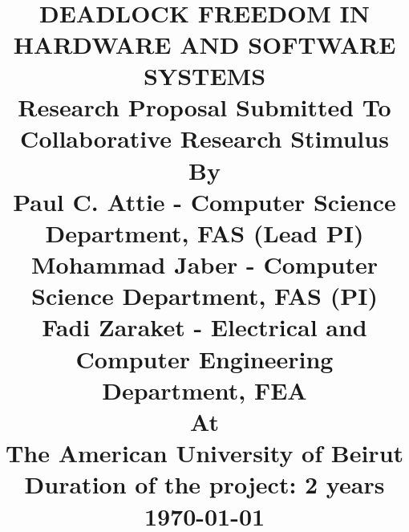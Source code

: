
\title{	\normalsize \textsc{} 	%
		 	\\[2.0cm]													%
			\HRule{0.5pt} \\										%
			\LARGE \textbf{\uppercase{Deadlock Freedom in Hardware and Software Systems}}	%
			\HRule{2pt} \\ [0.5cm]								%
			\large  			
			Research Proposal Submitted To Collaborative Research Stimulus\\[0.5cm]
			By\\[0.5cm]
			Paul C. Attie - Computer Science Department, FAS (Lead PI) \\[0.5cm]
			Mohammad Jaber - Computer Science Department, FAS (PI) \\[0.5cm]
			Fadi Zaraket  - Electrical and Computer Engineering Department, FEA \\[0.5cm]
			At \\[0.5cm]
			The American University of Beirut \\ [1cm]
                        Duration of the project: 2 years \\ [1cm]
			\today									%
		}

\author{
}



